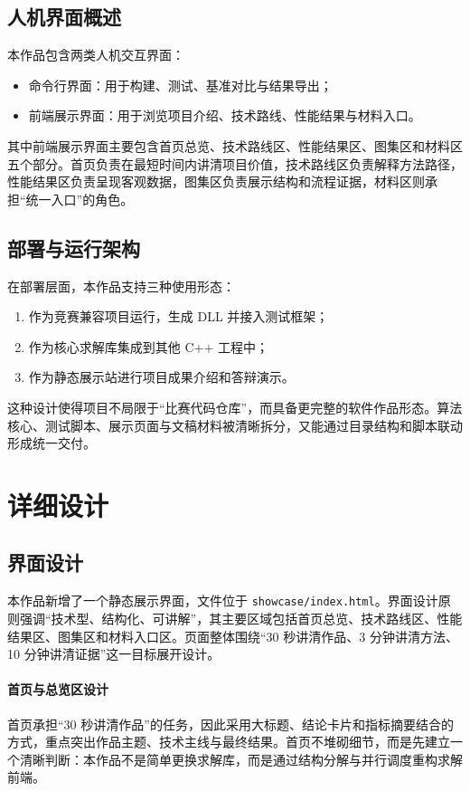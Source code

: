 \documentclass[12pt,a4paper,fontset=none]{ctexart}
\begin{document}
\subsection{人机界面概述}

本作品包含两类人机交互界面：
\begin{itemize}
  \item 命令行界面：用于构建、测试、基准对比与结果导出；
  \item 前端展示界面：用于浏览项目介绍、技术路线、性能结果与材料入口。
\end{itemize}

其中前端展示界面主要包含首页总览、技术路线区、性能结果区、图集区和材料区五个部分。首页负责在最短时间内讲清项目价值，技术路线区负责解释方法路径，性能结果区负责呈现客观数据，图集区负责展示结构和流程证据，材料区则承担“统一入口”的角色。

\subsection{部署与运行架构}

在部署层面，本作品支持三种使用形态：
\begin{enumerate}
  \item 作为竞赛兼容项目运行，生成 DLL 并接入测试框架；
  \item 作为核心求解库集成到其他 C++ 工程中；
  \item 作为静态展示站进行项目成果介绍和答辩演示。
\end{enumerate}

这种设计使得项目不局限于“比赛代码仓库”，而具备更完整的软件作品形态。算法核心、测试脚本、展示页面与文稿材料被清晰拆分，又能通过目录结构和脚本联动形成统一交付。

\section{详细设计}

\subsection{界面设计}

本作品新增了一个静态展示界面，文件位于 \texttt{showcase/index.html}。界面设计原则强调“技术型、结构化、可讲解”，其主要区域包括首页总览、技术路线区、性能结果区、图集区和材料入口区。页面整体围绕“30 秒讲清作品、3 分钟讲清方法、10 分钟讲清证据”这一目标展开设计。

\paragraph{首页与总览区设计}
首页承担“30 秒讲清作品”的任务，因此采用大标题、结论卡片和指标摘要结合的方式，重点突出作品主题、技术主线与最终结果。首页不堆砌细节，而是先建立一个清晰判断：本作品不是简单更换求解库，而是通过结构分解与并行调度重构求解前端。
\end{document}
